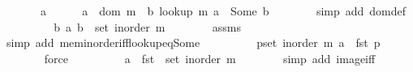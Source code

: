 \begin{isabellebody}
%
\isadelimproof
%
\endisadelimproof
%
\isatagproof
{}\isamarkupfalse%
\ {\isacharminus}{\kern0pt}\isanewline
\ \ \isacommand{{\isacharbraceleft}{\kern0pt}}\isamarkupfalse%
\ \isamarkupfalse%
\ a\isanewline
\ \ \ \ \isamarkupfalse%
\ {\isachardoublequoteopen}a\ {\isasymin}\ dom\ m\ {\isasymlongleftrightarrow}\ {\isacharparenleft}{\kern0pt}{\isasymexists}b{\isachardot}{\kern0pt}\ lookup\ m\ a\ {\isacharequal}{\kern0pt}\ Some\ b{\isacharparenright}{\kern0pt}{\isachardoublequoteclose}\isanewline
\ \ \ \ \ \ \isamarkupfalse%
\ {\isacharparenleft}{\kern0pt}simp\ add{\isacharcolon}{\kern0pt}\ dom{\isacharunderscore}{\kern0pt}def{\isacharparenright}{\kern0pt}\isanewline
\ \ \ \ \isamarkupfalse%
\ \isamarkupfalse%
\ {\isachardoublequoteopen}{\isachardot}{\kern0pt}{\isachardot}{\kern0pt}{\isachardot}{\kern0pt}\ {\isasymlongleftrightarrow}\ {\isacharparenleft}{\kern0pt}{\isasymexists}b{\isachardot}{\kern0pt}\ {\isacharparenleft}{\kern0pt}a{\isacharcomma}{\kern0pt}\ b{\isacharparenright}{\kern0pt}\ {\isasymin}\ set\ {\isacharparenleft}{\kern0pt}inorder\ m{\isacharparenright}{\kern0pt}{\isacharparenright}{\kern0pt}{\isachardoublequoteclose}\isanewline
\ \ \ \ \ \ \isamarkupfalse%
\ assms\isanewline
\ \ \ \ \ \ \isamarkupfalse%
\ {\isacharparenleft}{\kern0pt}simp\ add{\isacharcolon}{\kern0pt}\ mem{\isacharunderscore}{\kern0pt}inorder{\isacharunderscore}{\kern0pt}iff{\isacharunderscore}{\kern0pt}lookup{\isacharunderscore}{\kern0pt}eq{\isacharunderscore}{\kern0pt}Some{\isacharparenright}{\kern0pt}\isanewline
\ \ \ \ \isamarkupfalse%
\ \isamarkupfalse%
\ {\isachardoublequoteopen}{\isachardot}{\kern0pt}{\isachardot}{\kern0pt}{\isachardot}{\kern0pt}\ {\isasymlongleftrightarrow}\ {\isacharparenleft}{\kern0pt}{\isasymexists}p{\isasymin}set\ {\isacharparenleft}{\kern0pt}inorder\ m{\isacharparenright}{\kern0pt}{\isachardot}{\kern0pt}\ a\ {\isacharequal}{\kern0pt}\ fst\ p{\isacharparenright}{\kern0pt}{\isachardoublequoteclose}\isanewline
\ \ \ \ \ \ \isamarkupfalse%
\ force\isanewline
\ \ \ \ \isamarkupfalse%
\ \isamarkupfalse%
\ {\isachardoublequoteopen}{\isachardot}{\kern0pt}{\isachardot}{\kern0pt}{\isachardot}{\kern0pt}\ {\isasymlongleftrightarrow}\ a\ {\isasymin}\ fst\ {\isacharbackquote}{\kern0pt}\ set\ {\isacharparenleft}{\kern0pt}inorder\ m{\isacharparenright}{\kern0pt}{\isachardoublequoteclose}\isanewline
\ \ \ \ \ \ \isamarkupfalse%
\ {\isacharparenleft}{\kern0pt}simp\ add{\isacharcolon}{\kern0pt}\ image{\isacharunderscore}{\kern0pt}iff{\isacharparenright}{\kern0pt}\isanewline

\end{isabellebody}
